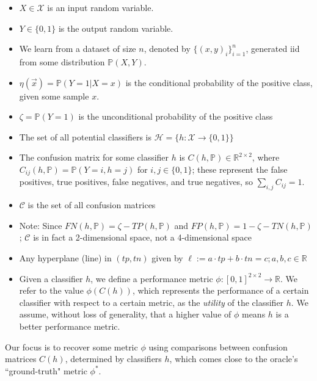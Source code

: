 \documentclass[
  letterpaper,
  numbers=noenddot,
  DIV=11,
  oneside]{scrreprt}
\theoremstyle{remark}
\begin{document}
\begin{itemize}
\item
  \(X \in \mathcal{X}\) is an input random variable.
\item
  \(Y \in \{0, 1\}\) is the output random variable.
\item
  We learn from a dataset of size \(n\), denoted by
  \(\{(x, y)_i\}^n_{i=1}\), generated iid from some distribution
  \(\mathbb{P}(X, Y)\).
\item
  \(\eta(\vec{x}) = \mathbb{P}(Y=1 | X=x)\) is the conditional
  probability of the positive class, given some sample \(x\).
\item
  \(\zeta = \mathbb{P}(Y=1)\) is the unconditional probability of the
  positive class
\item
  The set of all potential classifiers is
  \(\mathcal{H} = \{h : \mathcal{X} \rightarrow \{0,1\}\}\)
\item
  The confusion matrix for some classifier \(h\) is
  \(C(h, \mathbb{P}) \in \mathbb{R}^{2 \times 2}\), where
  \(C_{ij}(h, \mathbb{P}) = \mathbb{P}(Y=i, h=j)\) for
  \(i, j \in \{0,1\}\); these represent the false positives, true
  positives, false negatives, and true negatives, so
  \(\sum_{i,j}C_{ij}=1\).
\item
  \(\mathcal{C}\) is the set of all confusion matrices
\item
  Note: Since \(FN(h, \mathbb{P}) =\zeta - TP(h, \mathbb{P})\) and
  \(FP(h, \mathbb{P}) = 1 - \zeta - TN(h, \mathbb{P})\); \(\mathcal{C}\)
  is in fact a 2-dimensional space, not a 4-dimensional space
\item
  Any hyperplane (line) in \((tp, tn)\) given by
  \(\ell := a \cdot tp + b \cdot tn = c; a, b, c\in \mathbb{R}\)
\item
  Given a classifier \(h\), we define a performance metric
  \(\phi : [0, 1]^{2 \times 2} \rightarrow \mathbb{R}\). We refer to the
  value \(\phi(C(h))\), which represents the performance of a certain
  classifier with respect to a certain metric, as the \emph{utility} of
  the classifier \(h\). We assume, without loss of generality, that a
  higher value of \(\phi\) means \(h\) is a better performance metric.
\end{itemize}

Our focus is to recover some metric \(\phi\) using comparisons between
confusion matrices \(C(h)\), determined by classifiers \(h\), which
comes close to the oracle's ``ground-truth" metric \(\phi^*\).
\end{document}
